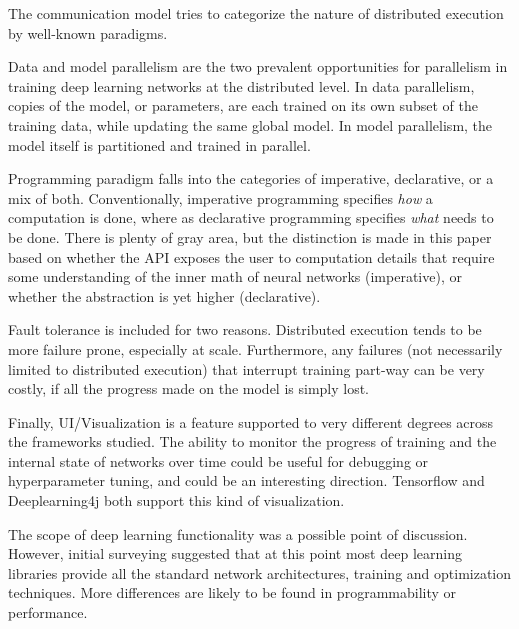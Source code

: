 The communication model tries to categorize the nature of distributed execution by well-known paradigms. 

Data and model parallelism are the two prevalent opportunities for parallelism in training deep learning networks at the distributed level. In data parallelism, copies of the model, or parameters, are each trained on its own subset of the training data, while updating the same global model. In model parallelism, the model itself is partitioned and trained in parallel. 

Programming paradigm falls into the categories of imperative, declarative, or a mix of both. Conventionally, imperative programming specifies \textit{how} a computation is done, where as declarative programming specifies \textit{what} needs to be done. There is plenty of gray area, but the distinction is made in this paper based on whether the API exposes the user to computation details that require some understanding of the inner math of neural networks (imperative), or whether the abstraction is yet higher (declarative). 

Fault tolerance is included for two reasons. Distributed execution tends to be more failure prone, especially at scale. Furthermore, any failures (not necessarily limited to distributed execution) that interrupt training part-way can be very costly, if all the progress made on the model is simply lost. 

Finally, UI/Visualization is a feature supported to very different degrees across the frameworks studied. The ability to monitor the progress of training and the internal state of networks over time could be useful for debugging or hyperparameter tuning, and could be an interesting direction. Tensorflow and Deeplearning4j both support this kind of visualization. 

The scope of deep learning functionality was a possible point of discussion. However, initial surveying suggested that at this point most deep learning libraries provide all the standard network architectures, training and optimization techniques. More differences are likely to be found in programmability or performance. 
